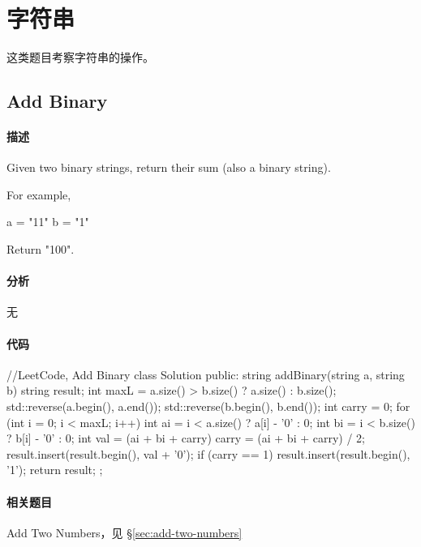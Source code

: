 \chapter{字符串}
这类题目考察字符串的操作。


\section{Add Binary} %
\label{sec:add-binary}


\subsubsection{描述}
Given two binary strings, return their sum (also a binary string).

For example,
\begin{Code}
a = "11"
b = "1"
\end{Code}
Return {\small {} "100"}.


\subsubsection{分析}
无


\subsubsection{代码}
\begin{Code}
//LeetCode, Add Binary
class Solution {
public:
    string addBinary(string a, string b) {
        string result;
        int maxL = a.size() > b.size() ? a.size() : b.size();
        std::reverse(a.begin(), a.end());
        std::reverse(b.begin(), b.end());
        int carry = 0;
        for (int i = 0; i < maxL; i++) {
            int ai = i < a.size() ? a[i] - '0' : 0;
            int bi = i < b.size() ? b[i] - '0' : 0;
            int val = (ai + bi + carry) %
            carry = (ai + bi + carry) / 2;
            result.insert(result.begin(), val + '0');
        }
        if (carry == 1) {
            result.insert(result.begin(), '1');
        }
        return result;
    }
};
\end{Code}


\subsubsection{相关题目}
\begindot
\item Add Two Numbers，见 \S \ref{sec:add-two-numbers}
\myenddot

